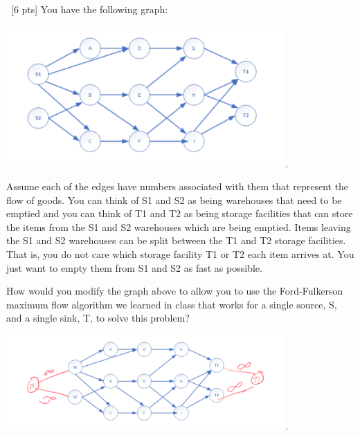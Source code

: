 \documentclass[12pt]{article}
\newenvironment{sol}[1][Solution]{\begin{trivlist}\item[\hskip\labelsep {\bfseries #1:}]}{\end{trivlist}}
\begin{document}
\begin{enumerate}
    \item \ [6 pts] You have the following graph:
        \begin{center}
        \includegraphics[width=0.8\textwidth]{p4.png}.
        \end{center}
    Assume each of the edges have numbers associated with them that represent the flow of goods. You can think of S1 and S2 as being warehouses that need to be emptied and you can think of T1 and T2 as being storage facilities that can store the items from the S1 and S2 warehouses which are being emptied. Items leaving the S1 and S2 warehouses can be split between the T1 and T2 storage facilities. That is, you do not care which storage facility T1 or T2 each item arrives at. You just want to empty them from S1 and S2 as fast as possible. 
    
    How would you modify the graph above to allow you to use the Ford-Fulkerson maximum flow algorithm we learned in class that works for a single source, S, and a single sink, T, to solve this problem?
    \begin{sol}
                \begin{center}
        \includegraphics[width=0.8\textwidth]{p6.png}.
        \end{center}
    \end{sol}
    

\end{enumerate}
\end{document}
